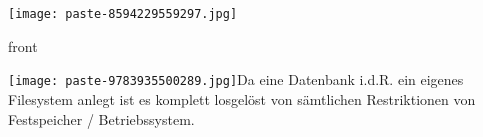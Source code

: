 \documentclass{article}
\begin{document}
\begin{tcolorbox}[colback=white!10!white,colframe=lightgray!75!black,
  savelowerto=\jobname_ex.tex]

\begin{center}
\texttt{[image: paste-8594229559297.jpg]}
\end{center}

\tcblower

\justifying

\end{tcolorbox}
\begin{tcolorbox}[colback=white!10!white,colframe=lightgray!75!black,
  savelowerto=\jobname_ex.tex]

\begin{center}
front

\end{center}

\tcblower

\justifying
\texttt{[image: paste-9783935500289.jpg]}Da eine Datenbank i.d.R. ein eigenes Filesystem anlegt ist es komplett losgelöst von sämtlichen Restriktionen von Festspeicher / Betriebssystem.

\end{tcolorbox}
\end{document}
